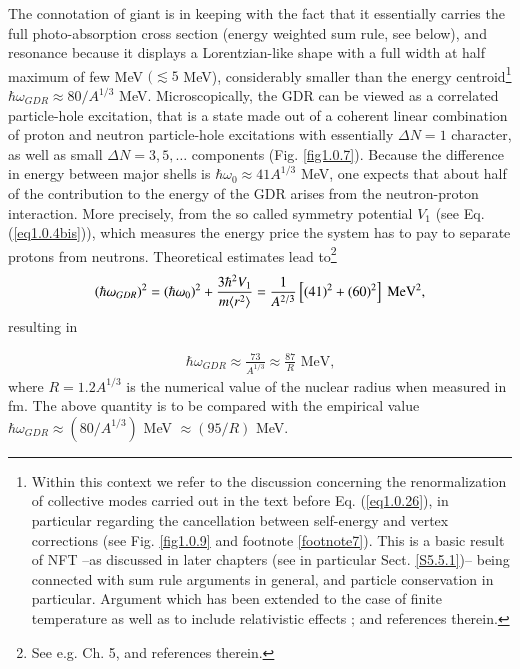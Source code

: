 The connotation of giant is in keeping with the fact that it essentially carries the full photo-absorption cross section (energy weighted sum rule, see below), and resonance because it displays a Lorentzian-like shape with a full width at half maximum of few MeV $(\lesssim5$ MeV), considerably  smaller than the energy centroid\footnote{Within this context we refer to the discussion concerning the renormalization of collective modes carried out in the text before Eq. (\ref{eq1.0.26}), in particular regarding the cancellation between self-energy and vertex corrections (see Fig. \ref{fig1.0.9} and footnote \ref{footnote7}). This is a basic result of NFT --as discussed in later chapters (see in particular Sect. \ref{S5.5.1})-- being connected with sum rule arguments in general, and particle conservation in particular. Argument which has been extended to the case of finite temperature as well as to include relativistic effects \cite{Ward:50,Nambu:60,Bortignon:81,Bertsch:83,Bortignon:98,Litvinova:18,Wibowo:19}; \cite{Lalazissis:19} and references therein.} $\hbar\omega_{GDR}\approx80/A^{1/3}$ MeV. Microscopically, the GDR can be viewed as a correlated particle-hole excitation, that is a state made out of a coherent linear combination of proton and neutron particle-hole excitations with essentially $\Delta N=1$ character, as well as small $\Delta N=3,5,\dots$ components (Fig. \ref{fig1.0.7}). Because the difference in energy between major shells is $\hbar\omega_0\approx41A^{1/3}$ MeV, one expects that about half of the contribution to the energy of the GDR arises from the neutron-proton interaction. More precisely, from the so called  symmetry potential $V_1$ (see Eq.  (\ref{eq1.0.4bis})), which measures the energy price the system has to pay to separate protons from neutrons. Theoretical estimates lead to\footnote{See e.g. \cite{Bertsch:05} Ch. 5, and references therein.} 
\begin{align}\label{eq0.1.106}
(\hbar\omega_{GDR})^2=(\hbar\omega_0)^2+\frac{3\hbar^2V_1}{m\langle {r^2} \rangle}=\frac{1}{A^{2/3}}\left[(41)^2+(60)^2\right]\text{ MeV}^2,
\end{align}
resulting in

\begin{align}\label{eq0.1.107}
\hbar\omega_{GDR}\approx\frac{73}{A^{1/3}}\approx\frac{87}{R}\text{ MeV,}
\end{align}
where $R=1.2A^{1/3}$ is the numerical value of the nuclear radius when measured in fm. The above quantity is to be compared with the empirical value $\hbar\omega_{GDR}\approx(80/A^{1/3})$ MeV $\approx(95/R)$ MeV.

